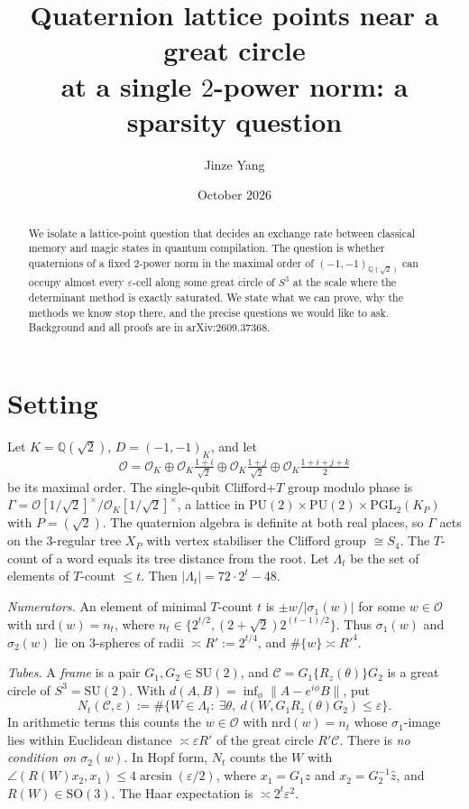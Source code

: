 \documentclass[11pt]{amsart}
\title[Quaternion lattice points near a great circle at one norm]{Quaternion lattice points near a great circle\\ at a single $2$-power norm: a sparsity question}
\author{Jinze Yang}
\date{October 2026}
\theoremstyle{remark}
\newcommand{\Q}{\mathbb Q}
\newcommand{\cO}{\mathcal O}
\newcommand{\nrd}{\mathrm{nrd}}
\newcommand{\dproj}{d}
\begin{document}
\begin{abstract}
We isolate a lattice-point question that decides an exchange rate between classical memory and magic states in quantum compilation. The question is whether quaternions of a fixed $2$-power norm in the maximal order of $(-1,-1)_{\Q(\sqrt2)}$ can occupy almost every $\varepsilon$-cell along some great circle of $S^3$ at the scale where the determinant method is exactly saturated. We state what we can prove, why the methods we know stop there, and the precise questions we would like to ask. Background and all proofs are in arXiv:2609.37368.
\end{abstract}
\maketitle

\section{Setting}
Let $K=\Q(\sqrt2)$, $D=(-1,-1)_K$, and let
\[
\cO=\cO_K\oplus\cO_K\tfrac{1+i}{\sqrt2}\oplus\cO_K\tfrac{1+j}{\sqrt2}\oplus\cO_K\tfrac{1+i+j+k}{2}
\]
be its maximal order. The single-qubit Clifford+$T$ group modulo phase is $\Gamma=\cO[1/\sqrt2]^\times/\cO_K[1/\sqrt2]^\times$, a lattice in $\mathrm{PU}(2)\times\mathrm{PU}(2)\times\mathrm{PGL}_2(K_P)$ with $P=(\sqrt2)$. The quaternion algebra is definite at both real places, so $\Gamma$ acts on the $3$-regular tree $X_P$ with vertex stabiliser the Clifford group $\cong S_4$. The $T$-count of a word equals its tree distance from the root. Let $\Lambda_t$ be the set of elements of $T$-count $\le t$. Then $|\Lambda_t|=72\cdot2^t-48$.

\emph{Numerators.} An element of minimal $T$-count $t$ is $\pm w/|\sigma_1(w)|$ for some $w\in\cO$ with $\nrd(w)=n_t$, where $n_t\in\{2^{t/2},(2+\sqrt2)2^{(t-1)/2}\}$. Thus $\sigma_1(w)$ and $\sigma_2(w)$ lie on $3$-spheres of radii $\asymp R':=2^{t/4}$, and $\#\{w\}\asymp R'^4$.

\emph{Tubes.} A \emph{frame} is a pair $G_1,G_2\in\mathrm{SU}(2)$, and $\mathcal C=G_1\{R_z(\theta)\}G_2$ is a great circle of $S^3=\mathrm{SU}(2)$. With $\dproj(A,B)=\inf_\phi\|A-e^{i\phi}B\|$, put
\[
N_t(\mathcal C,\varepsilon):=\#\{W\in\Lambda_t:\ \exists\theta,\ \dproj(W,G_1R_z(\theta)G_2)\le\varepsilon\}.
\]
In arithmetic terms this counts the $w\in\cO$ with $\nrd(w)=n_t$ whose $\sigma_1$-image lies within Euclidean distance $\asymp\varepsilon R'$ of the great circle $R'\mathcal C$. There is \emph{no condition on $\sigma_2(w)$}. In Hopf form, $N_t$ counts the $W$ with $\angle(R(W)x_2,x_1)\le4\arcsin(\varepsilon/2)$, where $x_1=G_1\hat z$ and $x_2=G_2^{-1}\hat z$, and $R(W)\in\mathrm{SO}(3)$. The Haar expectation is $\asymp2^t\varepsilon^2$.
\end{document}
